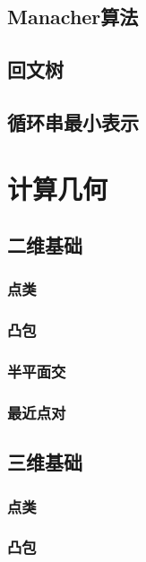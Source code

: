 \documentclass[openany, a4paper, 10pt]{book}
\begin{document}
\begin{spacing}{1.1}
		\section{Manacher算法}
			
		\section{回文树}
		\section{循环串最小表示}
	\chapter{计算几何}
		\section{二维基础}
			\subsection{点类}
				
			\subsection{凸包}
				
			\subsection{半平面交}
				
			\subsection{最近点对}
				
		\section{三维基础}
			\subsection{点类}
				
			\subsection{凸包}
				

\end{spacing}
\end{document}
